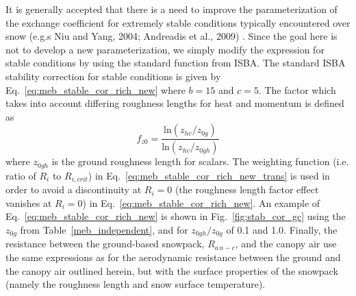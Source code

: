 %
It is generally accepted 
that there is a need to improve the parameterization of the exchange
coefficient for
extremely stable conditions typically encountered over snow
(e.g.s Niu and Yang, 2004; Andreadis et al., 2009)
\nocite{niu_yang_2004,andreadis_ea_2009}.
%
Since the goal here is not to develop a new parameterization,
we simply modify the expression for stable conditions
by using the standard function from ISBA. 
The standard ISBA stability correction for stable conditions is given
by Eq.~\ref{eq:meb_stable_cor_rich_new}
where $b=15$ and $c=5$.
The factor which takes into account differing roughness lengths for heat and momentum
is defined as
%
\begin{equation}
  \label{eq:meb_stable_cor_rich_orig_isba}
f_{z0} = 
{\frac{ {\mathrm{ln}}\left(z_{hv}/z_{0g}   \right) }
      { {\mathrm{ln}}\left(z_{hv}/z_{0gh}\right) } }
%
\end{equation}
%
where $z_{0gh}$ is the ground roughness length for scalars.
The weighting function (i.e. ratio of $R_i$ to $R_{i,crit}$) in Eq.~\ref{eq:meb_stable_cor_rich_new_trans} 
is used in order to avoid a discontinuity at $R_i=0$ (the roughness length factor effect vanishes at $R_i=0$)
in Eq.~\ref{eq:meb_stable_cor_rich_new}.
%
%
An example of Eq.~\ref{eq:meb_stable_cor_rich_new} 
is shown in Fig.~\ref{fig:stab_cor_gc} using the $z_{0g}$ from
Table~\ref{meb_independent}, 
and for $z_{0gh}/z_{0g}$ of 0.1 and 1.0.
%
Finally, the resistance between the ground-based snowpack, $R_{a\,n-c}$, and the canopy air
use the same expressions as for the aerodynamic resistance between the
ground and the canopy air outlined herein, but with the surface
properties of the snowpack (namely the roughness length and snow surface temperature).


